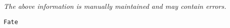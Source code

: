 \label{pkg:fate}

{\tiny \it The above information is manually maintained and may contain errors.}
\begin{verbatim}
Fate
\end{verbatim}
